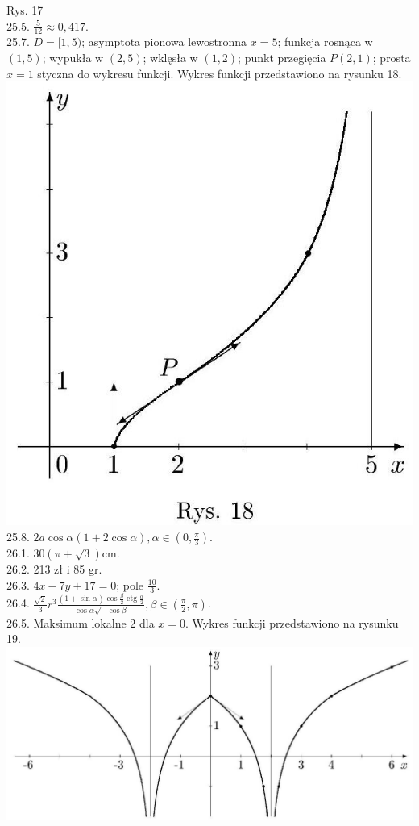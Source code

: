 \documentclass[10pt]{article}
\begin{document}
Rys. 17\\
25.5. $\frac{5}{12} \approx 0,417$.\\
25.7. $D=[1,5)$; asymptota pionowa lewostronna $x=5$; funkcja rosnąca w $(1,5)$; wypukła w $(2,5)$; wklęsła w $(1,2)$; punkt przegięcia $P(2,1)$; prosta $x=1$ styczna do wykresu funkcji. Wykres funkcji przedstawiono na rysunku 18.\\
\includegraphics[max width=\textwidth, center]{2024_11_16_fe5b564401bf7db98894g-072(1)}\\
25.8. $2 a \cos \alpha(1+2 \cos \alpha), \alpha \in\left(0, \frac{\pi}{3}\right)$.\\
26.1. $30(\pi+\sqrt{3}) \mathrm{cm}$.\\
26.2. 213 zł i 85 gr.\\
26.3. $4 x-7 y+17=0$; pole $\frac{10}{3}$.\\
26.4. $\frac{\sqrt{2}}{3} r^{3} \frac{(1+\sin \alpha) \cos \frac{\beta}{2} \operatorname{ctg} \frac{\alpha}{2}}{\cos \alpha \sqrt{-\cos \beta}}, \beta \in\left(\frac{\pi}{2}, \pi\right)$.\\
26.5. Maksimum lokalne 2 dla $x=0$. Wykres funkcji przedstawiono na rysunku 19.\\
\includegraphics[max width=\textwidth, center]{2024_11_16_fe5b564401bf7db98894g-073}
\end{document}
